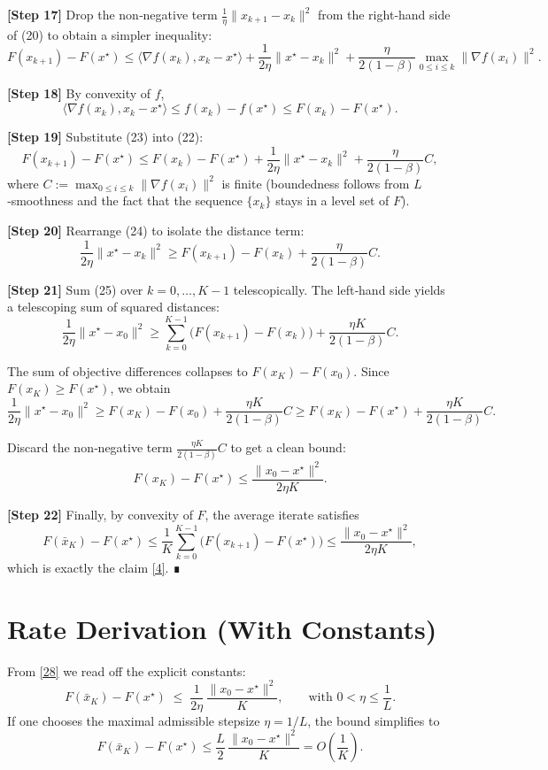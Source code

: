 \documentclass{article}
\begin{document}
\noindent\textbf{[Step 17]}  Drop the non‑negative term $\frac{1}{\eta}\|x_{k+1}-x_{k}\|^{2}$ from the right‑hand side of (20) to obtain a simpler inequality:
\[
F(x_{k+1})-F(x^{\star})
\le \langle\nabla f(x_{k}),x_{k}-x^{\star}\rangle
+\frac{1}{2\eta}\|x^{\star}-x_{k}\|^{2}
+\frac{\eta}{2(1-\beta)}\max_{0\le i\le k}\|\nabla f(x_{i})\|^{2}. \tag{22}
\]

\noindent\textbf{[Step 18]}  By convexity of $f$,
\[
\langle\nabla f(x_{k}),x_{k}-x^{\star}\rangle
\le f(x_{k})-f(x^{\star})\le F(x_{k})-F(x^{\star}). \tag{23}
\]

\noindent\textbf{[Step 19]}  Substitute (23) into (22):
\[
F(x_{k+1})-F(x^{\star})
\le F(x_{k})-F(x^{\star})
+\frac{1}{2\eta}\|x^{\star}-x_{k}\|^{2}
+\frac{\eta}{2(1-\beta)}C, \tag{24}
\]
where $C:=\max_{0\le i\le k}\|\nabla f(x_{i})\|^{2}$ is finite (boundedness follows from $L$‑smoothness and the fact that the sequence $\{x_{k}\}$ stays in a level set of $F$).

\noindent\textbf{[Step 20]}  Rearrange (24) to isolate the distance term:
\[
\frac{1}{2\eta}\|x^{\star}-x_{k}\|^{2}
\ge F(x_{k+1})-F(x_{k}) +\frac{\eta}{2(1-\beta)}C. \tag{25}
\]

\noindent\textbf{[Step 21]}  Sum (25) over $k=0,\dots,K-1$ telescopically. The left‑hand side yields a telescoping sum of squared distances:
\[
\frac{1}{2\eta}\|x^{\star}-x_{0}\|^{2}
\ge \sum_{k=0}^{K-1}\bigl(F(x_{k+1})-F(x_{k})\bigr)
+\frac{\eta K}{2(1-\beta)}C. \tag{26}
\]

The sum of objective differences collapses to $F(x_{K})-F(x_{0})$. Since $F(x_{K})\ge F(x^{\star})$, we obtain
\[
\frac{1}{2\eta}\|x^{\star}-x_{0}\|^{2}
\ge F(x_{K})-F(x_{0})+\frac{\eta K}{2(1-\beta)}C
\ge F(x_{K})-F(x^{\star})+\frac{\eta K}{2(1-\beta)}C. \tag{27}
\]

Discard the non‑negative term $\frac{\eta K}{2(1-\beta)}C$ to get a clean bound:
\[
F(x_{K})-F(x^{\star})\le \frac{\|x_{0}-x^{\star}\|^{2}}{2\eta K}. \tag{28}
\]

\noindent\textbf{[Step 22]}  Finally, by convexity of $F$, the average iterate satisfies
\[
F(\bar{x}_{K})-F(x^{\star})\le\frac{1}{K}\sum_{k=0}^{K-1}\bigl(F(x_{k+1})-F(x^{\star})\bigr)
\le\frac{\|x_{0}-x^{\star}\|^{2}}{2\eta K}, 
\]
which is exactly the claim \eqref{4}.  ∎

\section*{Rate Derivation (With Constants)}
From \eqref{28} we read off the explicit constants:
\[
\boxed{\;
F(\bar{x}_{K})-F(x^{\star})\;\le\;\frac{1}{2\eta}\,\frac{\|x_{0}-x^{\star}\|^{2}}{K},
\qquad\text{with }0<\eta\le\frac{1}{L}.
\;}
\]
If one chooses the maximal admissible stepsize $\eta=1/L$, the bound simplifies to
\[
F(\bar{x}_{K})-F(x^{\star})\le \frac{L}{2}\,\frac{\|x_{0}-x^{\star}\|^{2}}{K}=O\!\left(\frac{1}{K}\right).
\]
\end{document}
